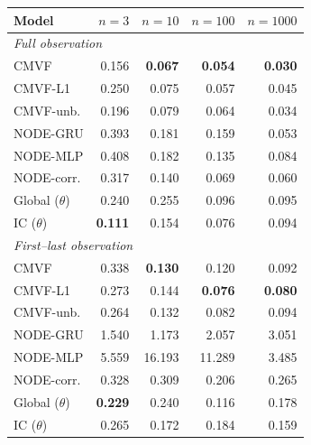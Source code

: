 \begin{tabular}{lrrrr}
\toprule
Model & $n{=}3$ & $n{=}10$ & $n{=}100$ & $n{=}1000$ \\
\midrule
\multicolumn{5}{l}{\emph{Full observation}} \\
CMVF & 0.156 & \textbf{0.067} & \textbf{0.054} & \textbf{0.030} \\
CMVF-L1 & 0.250 & 0.075 & 0.057 & 0.045 \\
CMVF-unb. & 0.196 & 0.079 & 0.064 & 0.034 \\
NODE-GRU & 0.393 & 0.181 & 0.159 & 0.053 \\
NODE-MLP & 0.408 & 0.182 & 0.135 & 0.084 \\
NODE-corr. & 0.317 & 0.140 & 0.069 & 0.060 \\
Global ($\theta$) & 0.240 & 0.255 & 0.096 & 0.095 \\
IC ($\theta$) & \textbf{0.111} & 0.154 & 0.076 & 0.094 \\
\midrule
\multicolumn{5}{l}{\emph{First--last observation}} \\
CMVF & 0.338 & \textbf{0.130} & 0.120 & 0.092 \\
CMVF-L1 & 0.273 & 0.144 & \textbf{0.076} & \textbf{0.080} \\
CMVF-unb. & 0.264 & 0.132 & 0.082 & 0.094 \\
NODE-GRU & 1.540 & 1.173 & 2.057 & 3.051 \\
NODE-MLP & 5.559 & 16.193 & 11.289 & 3.485 \\
NODE-corr. & 0.328 & 0.309 & 0.206 & 0.265 \\
Global ($\theta$) & \textbf{0.229} & 0.240 & 0.116 & 0.178 \\
IC ($\theta$) & 0.265 & 0.172 & 0.184 & 0.159 \\
\bottomrule
\end{tabular}
